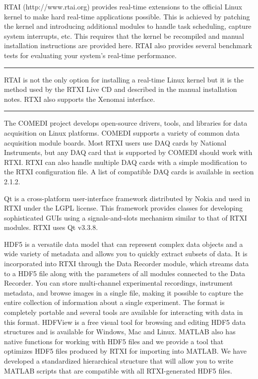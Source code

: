 RTAI (http://www.rtai.org) provides real-time extensions to the official Linux kernel to make hard real-time applications possible. This is achieved by patching the kernel and introducing additional modules to handle task scheduling, capture system interrupts, etc. This requires that the kernel be recompiled and manual installation instructions are provided here. RTAI also provides several benchmark tests for evaluating your system's real-time performance.
\bigskip

\hrule
\bigskip
RTAI is not the only option for installing a real-time Linux kernel but it is the method used by the RTXI Live CD and described in the manual installation notes. RTXI also supports the Xenomai interface.
\bigskip
\hrule
\bigskip

The COMEDI project develops open-source drivers, tools, and libraries for data acquisition on Linux platforms. COMEDI supports a variety of common data acquisition module boards. Most RTXI users use DAQ cards by National Instruments, but any DAQ card that is supported by COMEDI should work with RTXI. RTXI can also handle multiple DAQ cards with a simple modification to the RTXI configuration file. A list of compatible DAQ cards is available in section 2.1.2.

Qt is a cross-platform user-interface framework distributed by Nokia and used in RTXI under the LGPL license. This framework provides classes for developing sophisticated GUIs using a signals-and-slots mechanism similar to that of RTXI modules. RTXI uses Qt v3.3.8.

HDF5 is a versatile data model that can represent complex data objects and a wide variety of metadata and allows you to quickly extract subsets of data. It is incorporated into RTXI through the Data Recorder module, which streams data to a HDF5 file along with the parameters of all modules connected to the Data Recorder. You can store multi-channel experimental recordings, instrument metadata, and browse images in a single file, making it possible to capture the entire collection of information about a single experiment. The format is completely portable and several tools are available for interacting with data in this format. HDFView is a free visual tool for browsing and editing HDF5 data structures and is available for Windows, Mac and Linux. MATLAB also has native functions for working with HDF5 files and we provide a tool that optimizes HDF5 files produced by RTXI for importing into MATLAB. We have developed a standardized hierarchical structure that will allow you to write MATLAB scripts that are compatible with all RTXI-generated HDF5 files.

